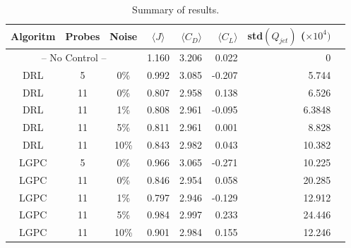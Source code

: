 \begin{table}[t]
\centering
\begin{tabular}{ccccrrrr}
\toprule
Algoritm & Probes & Noise & $\langle J \rangle$ & $\langle C_D \rangle$ & $\langle C_L \rangle$       & std$(Q_{jet})$ \small{($\times 10^4)$} \\ \midrule
\multicolumn{3}{c}{-- No Control --}        & 1.160 & 3.206 &  0.022 &  0 \\ \midrule
DRL       & 5      & 0\%   & 0.992 & 3.085 & -0.207 &  5.744 \\
DRL       & 11     & 0\%   & 0.807 & 2.958 &  0.138 & 6.526 \\
DRL       & 11     & 1\%   & 0.808 & 2.961 & -0.095 &  6.3848 \\
DRL       & 11     & 5\%   & 0.811 & 2.961 &  0.001 & 8.828 \\
DRL       & 11     & 10\%  & 0.843 & 2.982 &  0.043 & 10.382 \\ \midrule
LGPC     & 5      & 0\%   & 0.966 & 3.065 & -0.271 & 10.225 \\
LGPC     & 11     & 0\%   & 0.846 & 2.954 &  0.058 & 20.285 \\
LGPC     & 11     & 1\%   & 0.797 & 2.946 & -0.129 & 12.912 \\
LGPC     & 11     & 5\%   & 0.984 & 2.997 &  0.233 & 24.446 \\
LGPC     & 11     & 10\%  & 0.901 & 2.984 &  0.155 & 12.246 \\ \bottomrule
\end{tabular}
\caption{Summary of results.}
\label{tab:SummaryResults}
\end{table}

